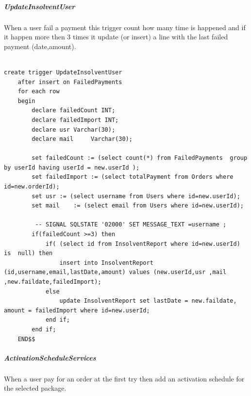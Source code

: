 \documentclass{article}
\begin{document}
\subparagraph{UpdateInsolventUser}
When a user fail a payment this trigger count how many time is happened and if it happen more then 3 times it update (or insert) a line with the last failed payment (date,amount).
\begin{lstlisting}

create trigger UpdateInsolventUser
    after insert on FailedPayments
	for each row
    begin
		declare failedCount INT;
        declare failedImport INT;
        declare usr Varchar(30);
        declare mail	 Varchar(30);

        set failedCount := (select count(*) from FailedPayments  group by userId having userId = new.userId );
        set failedImport := (select totalPayment from Orders where id=new.orderId);
        set usr := (select username from Users where id=new.userId);
        set mail    := (select email from Users where id=new.userId);
        
         -- SIGNAL SQLSTATE '02000' SET MESSAGE_TEXT =username ;
        if(failedCount >=3) then
			if( (select id from InsolventReport where id=new.userId) is  null) then
				insert into InsolventReport (id,username,email,lastDate,amount) values (new.userId,usr ,mail ,new.faildate,failedImport);
			else
				update InsolventReport set lastDate = new.faildate, amount = failedImport where id=new.userId;
			end if;
        end if;
    END$$
\end{lstlisting}
\subparagraph{ActivationScheduleServices}
When a user pay for an order at the first try then add an activation schedule for the selected package.
\end{document}
